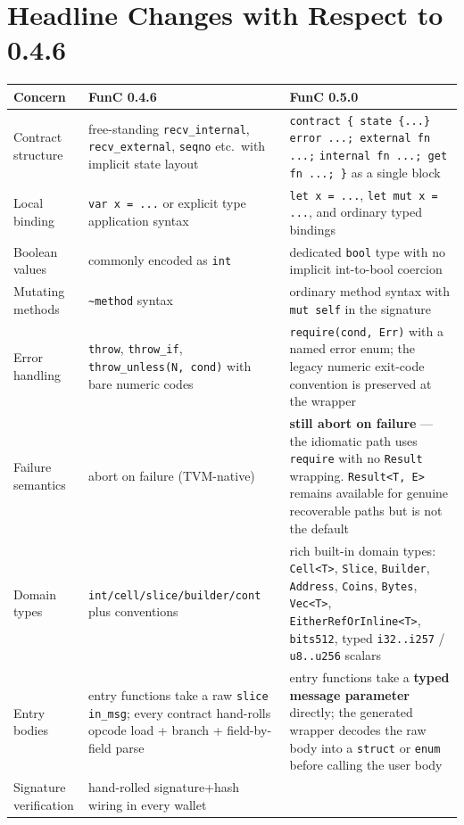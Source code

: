 \documentclass[12pt,oneside]{article}
\begin{document}
\section{Headline Changes with Respect to 0.4.6}
\begin{longtable}{|p{}|p{}|p{}|}
\hline
\textbf{Concern} & \textbf{FunC 0.4.6} & \textbf{FunC 0.5.0} \\ \hline
Contract structure &
free-standing \verb|recv_internal|, \verb|recv_external|, \verb|seqno|
etc.\ with implicit state layout &
\verb|contract { state {...} error ...; external fn ...;|
\verb|internal fn ...; get fn ...; }| as a single block \\ \hline
Local binding &
\verb|var x = ...| or explicit type application syntax &
\verb|let x = ...|, \verb|let mut x = ...|, and ordinary typed bindings \\ \hline
Boolean values &
commonly encoded as \verb|int| &
dedicated \verb|bool| type with no implicit int-to-bool coercion \\ \hline
Mutating methods &
\verb|~method| syntax &
ordinary method syntax with \verb|mut self| in the signature \\ \hline
Error handling &
\verb|throw|, \verb|throw_if|, \verb|throw_unless(N, cond)| with bare
numeric codes &
\verb|require(cond, Err)| with a named error enum; the legacy numeric
exit-code convention is preserved at the wrapper \\ \hline
Failure semantics &
abort on failure (TVM-native) &
\textbf{still abort on failure} --- the idiomatic path uses
\verb|require| with no \verb|Result| wrapping. \verb|Result<T, E>|
remains available for genuine recoverable paths but is not the default \\ \hline
Domain types &
\verb|int/cell/slice/builder/cont| plus conventions &
rich built-in domain types: \verb|Cell<T>|, \verb|Slice|,
\verb|Builder|, \verb|Address|, \verb|Coins|, \verb|Bytes|,
\verb|Vec<T>|, \verb|EitherRefOrInline<T>|, \verb|bits512|, typed
\verb|i32..i257| / \verb|u8..u256| scalars \\ \hline
Entry bodies &
entry functions take a raw \verb|slice in_msg|; every contract hand-rolls
opcode load + branch + field-by-field parse &
entry functions take a \textbf{typed message parameter} directly; the
generated wrapper decodes the raw body into a \verb|struct| or
\verb|enum| before calling the user body \\ \hline
Signature verification &
hand-rolled signature+hash wiring in every wallet &

\end{longtable}
\end{document}
